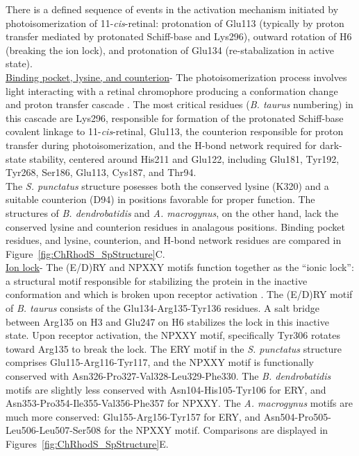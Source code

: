 \indent There is a defined sequence of events in the activation mechanism initiated by photoisomerization of 11-\textit{cis}-retinal: protonation of Glu113 (typically by proton transfer mediated by protonated Schiff-base and Lys296), outward rotation of H6 (breaking the ion lock), and protonation of Glu134 (re-stabalization in active state).\\
\indent \underline{Binding pocket, lysine, and counterion}- The photoisomerization process involves light interacting with a retinal chromophore producing a conformation change and proton transfer cascade \cite{Birge1990,Smith2010}. The most critical residues (\textit{B. taurus} numbering) in this cascade are Lys296, responsible for formation of the protonated Schiff-base covalent linkage to 11-\textit{cis}-retinal, Glu113, the counterion responsible for proton transfer during photoisomerization, and the H-bond network required for dark-state stability, centered around His211 and Glu122, including Glu181, Tyr192, Tyr268, Ser186, Glu113, Cys187, and Thr94. \\
\indent The \textit{S. punctatus} structure posesses both the conserved lysine (K320) and a suitable counterion (D94) in positions favorable for proper function. The structures of \textit{B. dendrobatidis} and \textit{A. macrogynus}, on the other hand, lack the conserved lysine and counterion residues in analagous positions. Binding pocket residues, and lysine, counterion, and H-bond network residues are compared in Figure~\ref{fig:ChRhodS_SpStructure}C.\\
\indent \underline{Ion lock}- The (E/D)RY and NPXXY motifs function together as the \enquote{ionic lock}: a structural motif responsible for stabilizing the protein in the inactive conformation and which is broken upon receptor activation \cite{Smith2010}. The (E/D)RY motif of \textit{B. taurus} consists of the Glu134-Arg135-Tyr136 residues. A salt bridge between Arg135 on H3 and Glu247 on H6 stabilizes the lock in this inactive state. Upon receptor activation, the NPXXY motif, specifically Tyr306 rotates toward Arg135 to break the lock. The ERY motif in the \textit{S. punctatus} structure comprises Glu115-Arg116-Tyr117, and the NPXXY motif is functionally conserved with Asn326-Pro327-Val328-Leu329-Phe330. The \textit{B. dendrobatidis} motifs are slightly less conserved with Asn104-His105-Tyr106 for ERY, and Asn353-Pro354-Ile355-Val356-Phe357 for NPXXY. The \textit{A. macrogynus} motifs are much more conserved: Glu155-Arg156-Tyr157 for ERY, and Asn504-Pro505-Leu506-Leu507-Ser508 for the NPXXY motif. Comparisons are displayed in Figures~\ref{fig:ChRhodS_SpStructure}E. \\
